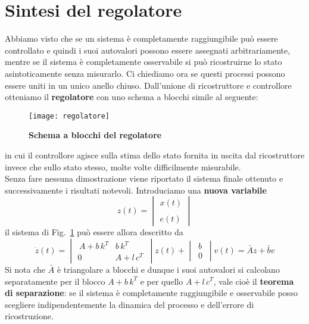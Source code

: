 \documentclass[a4paper]{article}
\begin{document}
	\section{Sintesi del regolatore}
	Abbiamo visto che se un sistema è completamente raggiungibile può essere controllato e quindi i suoi autovalori possono essere assegnati arbitrariamente, mentre se il sistema è completamente osservabile si può ricostruirne lo stato asintoticamente senza misurarlo. Ci chiediamo ora se questi processi possono essere uniti in un unico anello chiuso. 
	Dall'unione di ricostruttore e controllore otteniamo il \textbf{regolatore} con uno schema a blocchi simile al seguente:
	\begin{figure}[H]
		\centering
		\texttt{[image: regolatore]}%
		\caption{\textbf{Schema a blocchi del regolatore}}\label{figura:regolatore}
	\end{figure}
	in cui il controllore agisce sulla stima dello stato fornita in uscita dal ricostruttore invece che sullo stato stesso, molte volte difficilmente misurabile.
	\newline \\
	Senza fare nessuna dimostrazione viene riportato il sistema finale ottenuto e successivamente i risultati notevoli.
	Introduciamo una \textbf{nuova variabile} \[z(t)=\begin{vmatrix}
	x(t)\\
	\\
	e(t)
	\end{vmatrix}\] 
	il sistema di Fig.~\ref{figura:regolatore} può essere allora descritto da 
	\[
	\dot{z}(t)=\begin{vmatrix}
	\,A+b\,k^T & b\,k^T\\
	0 & A+l\,c^T\,
	\end{vmatrix}
	z(t)+\begin{vmatrix}
	\,b\,\\
	\,0\,
	\end{vmatrix}
	v(t)= \bar{A}z+\bar{b}v
	\]
	Si nota che $\bar{A}$ è triangolare a blocchi e dunque i suoi autovalori si calcolano separatamente per il blocco $A+b\,k^T$ e per quello $A+l\,c^T$, vale cioè il \textbf{teorema di separazione}: se il sistema è completamente raggiungibile e osservabile posso scegliere indipendentemente la dinamica del processo e dell'errore di ricostruzione.
	
\end{document}

